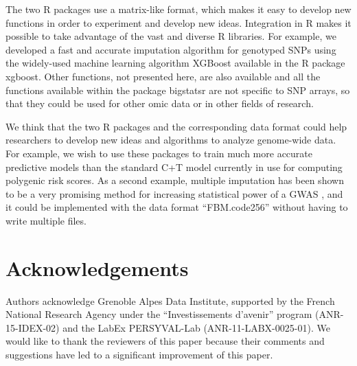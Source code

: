 \documentclass{bioinfo}
\begin{document}
The two R packages use a matrix-like format, which makes it easy to develop new functions in order to experiment and develop new ideas. Integration in R makes it possible to take advantage of the vast and diverse R libraries. For example, we developed a fast and accurate imputation algorithm for genotyped SNPs using the widely-used machine learning algorithm XGBoost available in the R package xgboost. Other functions, not presented here, are also available and all the functions available within the package bigstatsr are not specific to SNP arrays, so that they could be used for other omic data or in other fields of research.

We think that the two R packages and the corresponding data format could help researchers to develop new ideas and algorithms to analyze genome-wide data. For example, we wish to use these packages to train much more accurate predictive models than the standard C+T model currently in use for computing polygenic risk scores. As a second example, multiple imputation has been shown to be a very promising method for increasing statistical power of a GWAS \cite[]{Palmer2016}, and it could be implemented with the data format ``FBM.code256'' without having to write multiple files.



\section*{Acknowledgements}

Authors acknowledge Grenoble Alpes Data Institute, supported by the French National Research Agency under the ``Investissements d'avenir'' program (ANR-15-IDEX-02) and the LabEx PERSYVAL-Lab (ANR-11-LABX-0025-01). 
We would like to thank the reviewers of this paper because their comments and suggestions have led to a significant improvement of this paper.

\vspace*{-12pt}



\end{document}
